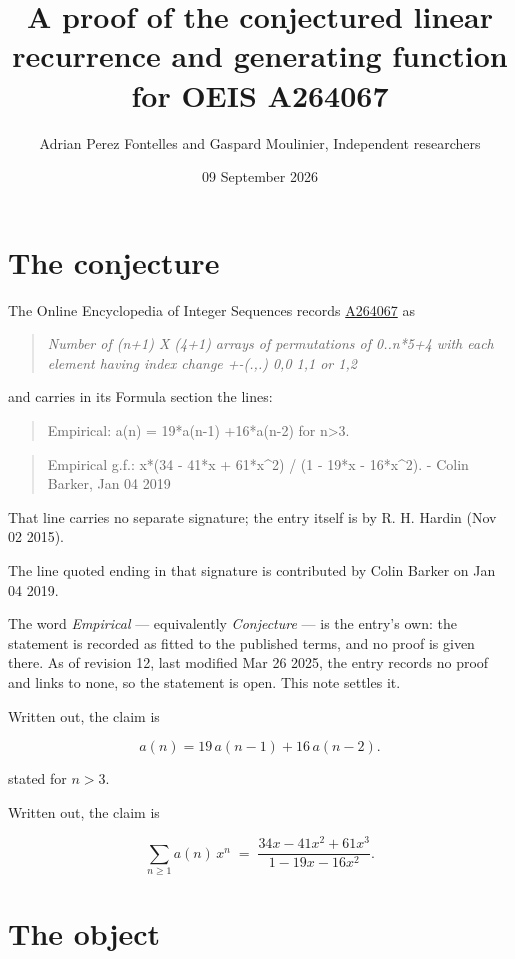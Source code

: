 \documentclass[11pt]{article}
\title{A proof of the conjectured linear recurrence and generating function for OEIS A264067}
\author{Adrian Perez Fontelles and Gaspard Moulinier, Independent researchers}
\date{09 September 2026}
\theoremstyle{definition}
\begin{document}
\maketitle
\section{The conjecture}

The Online Encyclopedia of Integer Sequences records \href{https://oeis.org/A264067}{A264067} as

\begin{quote}\itshape Number of (n+1) X (4+1) arrays of permutations of 0..n*5+4 with each element having index change +-(.,.) 0,0 1,1 or 1,2\end{quote}

and carries in its Formula section the lines:

\begin{quote}\ttfamily Empirical: a(n) = 19*a(n-1) +16*a(n-2) for n>3.\end{quote}

\begin{quote}\ttfamily Empirical g.f.: x*(34 - 41*x + 61*x\textasciicircum{}2) / (1 - 19*x - 16*x\textasciicircum{}2). - Colin Barker, Jan 04 2019\end{quote}

That line carries no separate signature; the entry itself is by R. H. Hardin (Nov 02 2015).

The line quoted ending in that signature is contributed by Colin Barker on Jan 04 2019.

The word {\itshape Empirical} --- equivalently {\itshape Conjecture} --- is the entry's own: the statement is recorded as fitted to the published terms, and no proof is given there. As of revision 12, last modified Mar 26 2025, the entry records no proof and links to none, so the statement is open. This note settles it.

Written out, the claim is

\[a(n) = 19\,a(n-1) + 16\,a(n-2).\]

stated for $n > 3$.

Written out, the claim is

\[\sum_{n \ge 1} a(n)\,x^n \;=\; \frac{34x - 41x^{2} + 61x^{3}}{1 - 19x - 16x^{2}}.\]

\section{The object}
\end{document}
